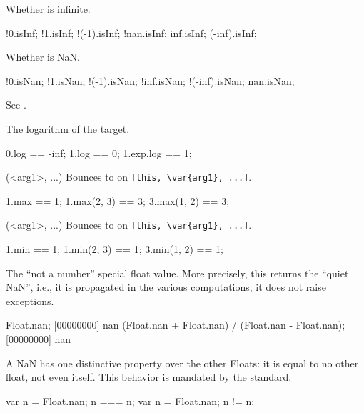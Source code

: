 \begin{urbiscriptapi}
\item[isInf]
  Whether is infinite.
\begin{urbiassert}
    !0.isInf; !1.isInf; !(-1).isInf;
  !nan.isInf;
   inf.isInf;  (-inf).isInf;
\end{urbiassert}

\item[isNan]
  Whether is NaN.
\begin{urbiassert}
     !0.isNan; !1.isNan; !(-1).isNan;
   !inf.isNan;  !(-inf).isNan;
    nan.isNan;
\end{urbiassert}

\item[limits]
  See .

\item[log]
  The logarithm of the target.
\begin{urbiassert}
0.log == -inf;
1.log == 0;
1.exp.log == 1;
\end{urbiassert}

\item[max](<arg1>, ...)%
  Bounces to  on \lstinline|[this, \var{arg1}, ...]|.
\begin{urbiassert}
1.max == 1;
1.max(2, 3) == 3;
3.max(1, 2) == 3;
\end{urbiassert}

\item[min](<arg1>, ...)%
  Bounces to  on \lstinline|[this, \var{arg1}, ...]|.
\begin{urbiassert}
1.min == 1;
1.min(2, 3) == 1;
3.min(1, 2) == 1;
\end{urbiassert}

\item[nan]
  The ``not a number'' special float value.  More precisely, this
  returns the ``quiet NaN'', i.e., it is propagated in the various
  computations, it does not raise exceptions.
\begin{urbiscript}
Float.nan;
[00000000] nan
(Float.nan + Float.nan) / (Float.nan - Float.nan);
[00000000] nan
\end{urbiscript}

A {NaN} has one distinctive property over the other Floats: it is
equal to no other float, not even itself.  This behavior is mandated
by the  standard.
\begin{urbiassert}
{ var n = Float.nan; n === n};
{ var n = Float.nan; n  != n};
\end{urbiassert}


\end{urbiscriptapi}
